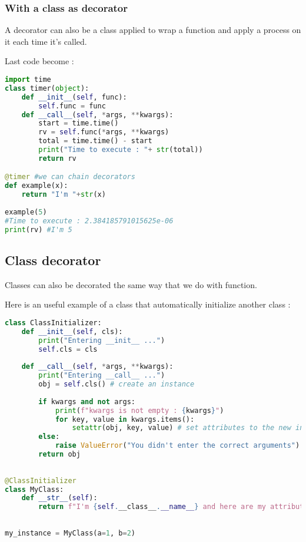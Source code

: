 \documentclass[a4paper, 12pt, titlepage]{scrartcl} %
\begin{document}
\subsubsection{With a class as decorator}
A decorator can also be a class applied to wrap a function and apply a process on it each time it's called.

\vspace{5mm}

Last code become :
\begin{lstlisting}[language=Python]
import time
class timer(object):
    def __init__(self, func):
        self.func = func
    def __call__(self, *args, **kwargs):
        start = time.time()
		rv = self.func(*args, **kwargs)
		total = time.time() - start
		print("Time to execute : "+ str(total))
		return rv

@timer #we can chain decorators
def example(x):
	return "I'm "+str(x)
	
example(5)
#Time to execute : 2.384185791015625e-06
print(rv) #I'm 5
\end{lstlisting} \vspace{5mm}

\subsection{Class decorator}
Classes can also be decorated the same way that we do with function.

\vspace{5mm}

Here is an useful example of a class that automatically initialize another class :
\begin{lstlisting}[language=Python]
class ClassInitializer:
    def __init__(self, cls):
        print("Entering __init__ ...")
        self.cls = cls
 
    def __call__(self, *args, **kwargs):
        print("Entering __call__ ...")
        obj = self.cls() # create an instance
 
        if kwargs and not args:
            print(f"kwargs is not empty : {kwargs}")
            for key, value in kwargs.items():
                setattr(obj, key, value) # set attributes to the new instance
        else:
            raise ValueError("You didn't enter the correct arguments")
        return obj
 
 
@ClassInitializer
class MyClass:
    def __str__(self):
        return f"I'm {self.__class__.__name__} and here are my attributes : {self.__dict__}"
 
 
my_instance = MyClass(a=1, b=2)
\end{lstlisting} \vspace{5mm}
\end{document}

